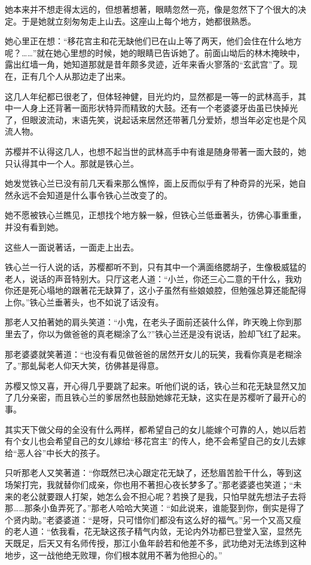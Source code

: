 \documentclass[12pt,oneside]{book}
\begin{document}
她本来并不想走得太远的，但想著想著，眼睛忽然一亮，像是忽然下了个很大的决定。于是她就立刻匆匆走上山去。这座山上每个地方，她都很熟悉。

她心里正在想：``移花宫主和花无缺他们已在山上等了两天，他们会住在什么地方呢？\ldots\ldots{}''就在她心里想的时候，她的眼睛已告诉她了。前面山坳后的林木掩映中，露出红墙一角，她知道那就是昔年颇多灵迹，近年来香火寥落的``玄武宫''了。现在，正有几个人从那边走了出来。

这几人年纪都已很老了，但体轻神健，目光灼灼，显然都是一等一的武林高手，其中一人身上还背著一面形状特异而精致的大鼓。还有一个老婆婆牙齿虽已快掉光了，但眼波流动，末语先笑，说起话来居然还带著几分爱娇，想当年必定也是个风流人物。

苏樱并不认得这几人，也想不起当世的武林高手中有谁是随身带著一面大鼓的，她只认得其中一个人。那就是铁心兰。

她发觉铁心兰已没有前几天看来那么憔悴，面上反而似乎有了种奇异的光采，她自然永远不会知道是什么事令铁心兰改变了的。

她不愿被铁心兰瞧见，正想找个地方躲一躲，但铁心兰低垂著头，彷佛心事重重，并没有看到她。

这些人一面说著话，一面走上出去。

铁心兰一行人说的话，苏樱都听不到，只有其中一个满面络腮胡子，生像极威猛的老人，说话的声音特别大。只厅这老人道：``小兰，你还三心二意的干什么，我劝你还是死心塌地的跟著花无缺算了，这小子虽然有些娘娘腔，但勉强总算还能配得上你。''铁心兰垂著头，也不如说了话没有。

那老人又拍著她的肩头笑道：``小鬼，在老头子面前还装什么佯，昨天晚上你到那里去了，你以为做爸爸的真老糊涂了么?''铁心兰还是没有说话，脸却飞红了起来。

那老婆婆就笑著道：``也没有看见做爸爸的居然开女儿的玩笑，我看你真是老糊涂了。''那虬髯老人仰天大笑，彷佛甚是得意。

苏樱又惊又喜，开心得几乎要跳了起来。听他们说的话，铁心兰和花无缺显然又加了几分亲密，而且铁心兰的爹居然也鼓励她嫁花无缺，这实在是苏樱听了最开心的事。

其实天下做父母的全没有什么两样，都希望自己的女儿能嫁个可靠的人，她以后若有个女儿也会希望自己的女儿嫁给``移花宫主''的传人，绝不会希望自己的女儿去嫁给``恶人谷''中长大的孩子。

只听那老人又笑著道：``你既然已决心跟定花无缺了，还愁眉苦脸干什么，等到这场架打完，我就替你们成亲，你也用不著担心夜长梦多了。''那老婆婆也笑道；``未来的老公就要跟人打架，她怎么会不担心呢？若换了是我，只怕早就先想法子去将那\ldots\ldots 那条小鱼弄死了。''那老人哈哈大笑道：``如此说来，谁能娶到你，倒实是得了个贤内助。''老婆婆道：``是呀，只可惜你们都没有这么好的福气。''另一个又高又瘦的老人道：``依我看，花无缺这孩子精气内敛，无论内外功都已登堂入室，显然先天既足，后天又有名师传授，那江小鱼年龄若和他差不多，武功绝对无法练到这种地步，这一战他绝无败理，你们根本就用不著为他担心的。''
\end{document}
